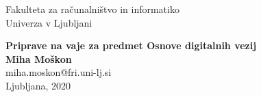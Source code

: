 \clearpage
\begin{center}
{\small Fakulteta za računalništvo in informatiko \\
 Univerza v Ljubljani\\}
\vspace{5cm}

 {\huge\bfseries\sffamily\color{chapter_col} Priprave na vaje za predmet Osnove digitalnih vezij\\}
 \vspace{3cm}
 {\large\bfseries Miha Moškon}\\[5pt]
 miha.moskon@fri.uni-lj.si\\[14pt]
  \vspace{2cm}
 \vfill
{Ljubljana, 2020}
\end{center}
\thispagestyle{empty}
